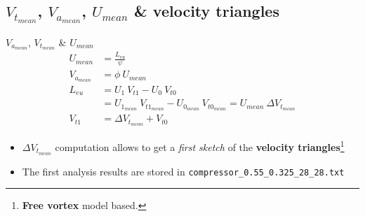 \subsection{$V_{t_{mean}}$, $V_{a_{mean}}$, $U_{mean}$ \& velocity triangles}
\begin{frame}[fragile]{$V_{a_{mean}}$, $V_{t_{mean}}$ \& $U_{mean}$}
	\begin{align}
		U_{mean} & = \frac{L_{eu}}{\psi} \nonumber \\ 
		V_{a_{mean}} & = \phi \ U_{mean} \nonumber \\
		L_{eu} & = U_1 \ V_{t1} - U_0 \ V_{t0} \nonumber \\ 
		       & = U_{1_{mean}} \ V_{t1_{mean}} - U_{0_{mean}} \ V_{t0_{mean}} = U_{mean} \ \Delta V_{t_{mean}} \nonumber \\
		V_{t1} & = \Delta V_{t_{mean}} + V_{t0} \nonumber  
	\end{align}
	\begin{itemize}
		\item $\Delta V_{t_{mean}}$ computation allows to get a \textit{first sketch} of the \textbf{velocity triangles}\footnote{\textbf{Free vortex} model based.}
		\item The first analysis results are stored in \verb|compressor_0.55_0.325_28_28.txt|
	\end{itemize}
\end{frame}

